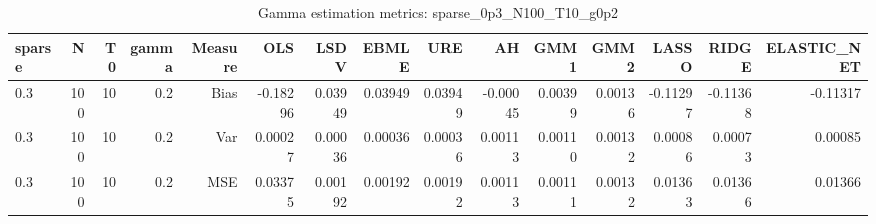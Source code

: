 \begin{table}[!htbp]\centering
\caption{Gamma estimation metrics: sparse_0p3_N100_T10_g0p2}
\label{tab:table1_sparse_0p3_N100_T10_g0p2}
\begin{tabular}{lrrrrrrrrrrrrrr}
\hline
sparse & N & T0 & gamma & Measure & OLS & LSDV & EBMLE & URE & AH & GMM1 & GMM2 & LASSO & RIDGE & ELASTIC_NET \\
\hline
0.3 & 100 & 10 & 0.2 & Bias & -0.18296 & 0.03949 & 0.03949 & 0.03949 & -0.00045 & 0.00399 & 0.00136 & -0.11297 & -0.11368 & -0.11317 \\
0.3 & 100 & 10 & 0.2 & Var & 0.00027 & 0.00036 & 0.00036 & 0.00036 & 0.00113 & 0.00110 & 0.00132 & 0.00086 & 0.00073 & 0.00085 \\
0.3 & 100 & 10 & 0.2 & MSE & 0.03375 & 0.00192 & 0.00192 & 0.00192 & 0.00113 & 0.00111 & 0.00132 & 0.01363 & 0.01366 & 0.01366 \\
\hline
\end{tabular}
\end{table}

